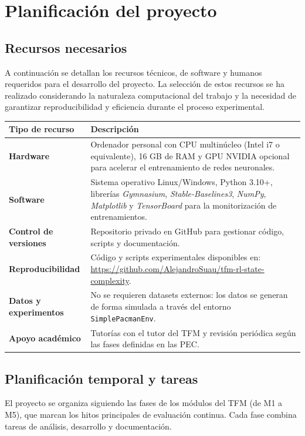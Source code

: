 \chapter{Planificación del proyecto}

\section{Recursos necesarios}

A continuación se detallan los recursos técnicos, de software y humanos requeridos para el desarrollo del proyecto. La selección de estos recursos se ha realizado considerando la naturaleza computacional del trabajo y la necesidad de garantizar reproducibilidad y eficiencia durante el proceso experimental.

\begin{longtable}{>{\bfseries}p{3.5cm} p{10cm}}
Tipo de recurso & Descripción \\ \hline
Hardware & Ordenador personal con CPU multinúcleo (Intel i7 o equivalente), 16 GB de RAM y GPU NVIDIA opcional para acelerar el entrenamiento de redes neuronales. \\
Software & Sistema operativo Linux/Windows, Python 3.10+, librerías \textit{Gymnasium}, \textit{Stable-Baselines3}, \textit{NumPy}, \textit{Matplotlib} y \textit{TensorBoard} para la monitorización de entrenamientos. \\
Control de versiones & Repositorio privado en GitHub para gestionar código, scripts y documentación. \\
Reproducibilidad & Código y scripts experimentales disponibles en: \url{https://github.com/AlejandroSuau/tfm-rl-state-complexity}. \\
Datos y experimentos & No se requieren datasets externos: los datos se generan de forma simulada a través del entorno \texttt{SimplePacmanEnv}. \\
Apoyo académico & Tutorías con el tutor del TFM y revisión periódica según las fases definidas en las PEC. \\
\end{longtable}

\section{Planificación temporal y tareas}

El proyecto se organiza siguiendo las fases de los módulos del TFM (de M1 a M5), que marcan los hitos principales de evaluación continua. Cada fase combina tareas de análisis, desarrollo y documentación.

